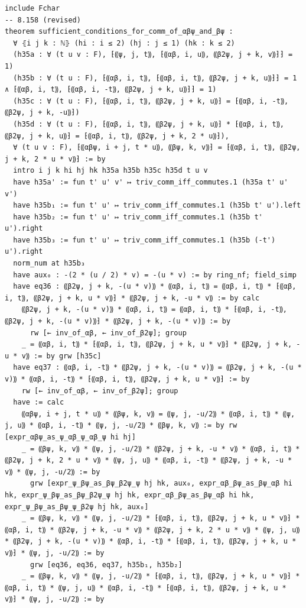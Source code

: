 \documentclass[10pt,a4paper]{article}
\begin{document}
\begin{Verbatim}
include Fchar
-- 8.158 (revised)
theorem sufficient_conditions_for_comm_of_αβψ_and_βψ :
  ∀ ⦃i j k : ℕ⦄ (hi : i ≤ 2) (hj : j ≤ 1) (hk : k ≤ 2)
  (h35a : ∀ (t u v : F), ⁅⸨ψ, j, t⸩, ⁅⸨αβ, i, u⸩, ⸨β2ψ, j + k, v⸩⁆⁆ = 1)
  (h35b : ∀ (t u : F), ⁅⸨αβ, i, t⸩, ⁅⸨αβ, i, t⸩, ⸨β2ψ, j + k, u⸩⁆⁆ = 1 ∧ ⁅⸨αβ, i, t⸩, ⁅⸨αβ, i, -t⸩, ⸨β2ψ, j + k, u⸩⁆⁆ = 1)
  (h35c : ∀ (t u : F), ⁅⸨αβ, i, t⸩, ⸨β2ψ, j + k, u⸩⁆ = ⁅⸨αβ, i, -t⸩, ⸨β2ψ, j + k, -u⸩⁆)
  (h35d : ∀ (t u : F), ⁅⸨αβ, i, t⸩, ⸨β2ψ, j + k, u⸩⁆ * ⁅⸨αβ, i, t⸩, ⸨β2ψ, j + k, u⸩⁆ = ⁅⸨αβ, i, t⸩, ⸨β2ψ, j + k, 2 * u⸩⁆),
  ∀ (t u v : F), ⁅⸨αβψ, i + j, t * u⸩, ⸨βψ, k, v⸩⁆ = ⁅⸨αβ, i, t⸩, ⸨β2ψ, j + k, 2 * u * v⸩⁆ := by
  intro i j k hi hj hk h35a h35b h35c h35d t u v
  have h35a' := fun t' u' v' ↦ triv_comm_iff_commutes.1 (h35a t' u' v')
  have h35b₁ := fun t' u' ↦ triv_comm_iff_commutes.1 (h35b t' u').left
  have h35b₂ := fun t' u' ↦ triv_comm_iff_commutes.1 (h35b t' u').right
  have h35b₃ := fun t' u' ↦ triv_comm_iff_commutes.1 (h35b (-t') u').right
  norm_num at h35b₃
  have aux₀ : -(2 * (u / 2) * v) = -(u * v) := by ring_nf; field_simp
  have eq36 : ⸨β2ψ, j + k, -(u * v)⸩ * ⸨αβ, i, t⸩ = ⸨αβ, i, t⸩ * ⁅⸨αβ, i, t⸩, ⸨β2ψ, j + k, u * v⸩⁆ * ⸨β2ψ, j + k, -u * v⸩ := by calc
    ⸨β2ψ, j + k, -(u * v)⸩ * ⸨αβ, i, t⸩ = ⸨αβ, i, t⸩ * ⁅⸨αβ, i, -t⸩, ⸨β2ψ, j + k, -(u * v)⸩⁆ * ⸨β2ψ, j + k, -(u * v)⸩ := by
      rw [← inv_of_αβ, ← inv_of_β2ψ]; group
    _ = ⸨αβ, i, t⸩ * ⁅⸨αβ, i, t⸩, ⸨β2ψ, j + k, u * v⸩⁆ * ⸨β2ψ, j + k, -u * v⸩ := by grw [h35c]
  have eq37 : ⸨αβ, i, -t⸩ * ⸨β2ψ, j + k, -(u * v)⸩ = ⸨β2ψ, j + k, -(u * v)⸩ * ⸨αβ, i, -t⸩ * ⁅⸨αβ, i, t⸩, ⸨β2ψ, j + k, u * v⸩⁆ := by
    rw [← inv_of_αβ, ← inv_of_β2ψ]; group
  have := calc
    ⸨αβψ, i + j, t * u⸩ * ⸨βψ, k, v⸩ = ⸨ψ, j, -u/2⸩ * ⸨αβ, i, t⸩ * ⸨ψ, j, u⸩ * ⸨αβ, i, -t⸩ * ⸨ψ, j, -u/2⸩ * ⸨βψ, k, v⸩ := by rw [expr_αβψ_as_ψ_αβ_ψ_αβ_ψ hi hj]
    _ = ⸨βψ, k, v⸩ * ⸨ψ, j, -u/2⸩ * ⸨β2ψ, j + k, -u * v⸩ * ⸨αβ, i, t⸩ * ⸨β2ψ, j + k, 2 * u * v⸩ * ⸨ψ, j, u⸩ * ⸨αβ, i, -t⸩ * ⸨β2ψ, j + k, -u * v⸩ * ⸨ψ, j, -u/2⸩ := by
      grw [expr_ψ_βψ_as_βψ_β2ψ_ψ hj hk, aux₀, expr_αβ_βψ_as_βψ_αβ hi hk, expr_ψ_βψ_as_βψ_β2ψ_ψ hj hk, expr_αβ_βψ_as_βψ_αβ hi hk, expr_ψ_βψ_as_βψ_ψ_β2ψ hj hk, aux₀]
    _ = ⸨βψ, k, v⸩ * ⸨ψ, j, -u/2⸩ * ⁅⸨αβ, i, t⸩, ⸨β2ψ, j + k, u * v⸩⁆ * ⸨αβ, i, t⸩ * ⸨β2ψ, j + k, -u * v⸩ * ⸨β2ψ, j + k, 2 * u * v⸩ * ⸨ψ, j, u⸩ * ⸨β2ψ, j + k, -(u * v)⸩ * ⸨αβ, i, -t⸩ * ⁅⸨αβ, i, t⸩, ⸨β2ψ, j + k, u * v⸩⁆ * ⸨ψ, j, -u/2⸩ := by
      grw [eq36, eq36, eq37, h35b₁, h35b₂]
    _ = ⸨βψ, k, v⸩ * ⸨ψ, j, -u/2⸩ * ⁅⸨αβ, i, t⸩, ⸨β2ψ, j + k, u * v⸩⁆ * ⸨αβ, i, t⸩ * ⸨ψ, j, u⸩ * ⸨αβ, i, -t⸩ * ⁅⸨αβ, i, t⸩, ⸨β2ψ, j + k, u * v⸩⁆ * ⸨ψ, j, -u/2⸩ := by

\end{Verbatim}
\end{document}
